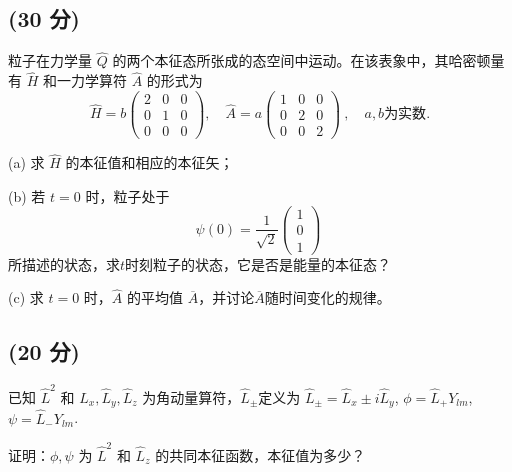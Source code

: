  \subsection{(30 分)}
 粒子在力学量 $\hat{Q}$ 的两个本征态所张成的态空间中运动。在该表象中，其哈密顿量有 $\hat{H}$ 和一力学算符 $\hat{A}$ 的形式为
$$
\hat{H} = b \begin{pmatrix}
2 & 0 & 0 \\
0 & 1 & 0 \\
0 & 0 & 0 
\end{pmatrix}, \quad \hat{A} = a \begin{pmatrix}
1 & 0 & 0 \\
0 & 2 & 0 \\
0 & 0 & 2 
\end{pmatrix}~, \quad a, b \text{为实数}.
$$

(a) 求 $\hat{H}$ 的本征值和相应的本征矢；

(b) 若 $t = 0$ 时，粒子处于
$$
\psi(0) = \frac{1}{\sqrt{2}} \begin{pmatrix}
1 \\
0 \\
1
\end{pmatrix}~
$$
所描述的状态，求$t$时刻粒子的状态，它是否是能量的本征态？

(c) 求 $t = 0$ 时，$\hat{A}$ 的平均值 $\overline{A}$，并讨论$\overline{A}$随时间变化的规律。
\subsection{(20 分)}
已知 $\hat{L}^2$ 和 $\hat{L}_x, \hat{L}_y, \hat{L}_z$ 为角动量算符，$\hat{L}_\pm$定义为 $\hat{L}_\pm = \hat{L}_x \pm i\hat{L}_y$, $\phi = \hat{L}_+ Y_{lm}$, $\psi = \hat{L}_- Y_{lm}$.

证明：$\phi, \psi$ 为 $\hat{L}^2$ 和 $\hat{L}_z$ 的共同本征函数，本征值为多少？